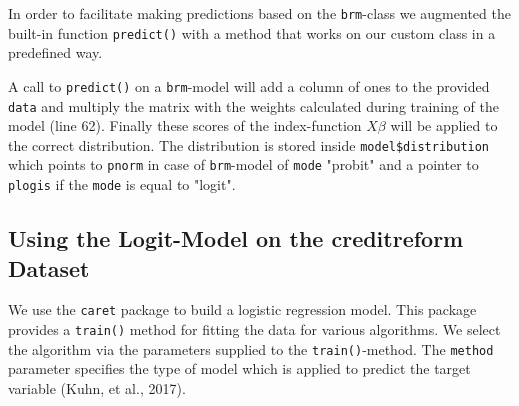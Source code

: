 \documentclass{article}
\begin{document}
In order to facilitate making predictions based on the \texttt{brm}-class we augmented the built-in function \texttt{predict()} with a method that works on our custom class in a predefined way.



A call to \texttt{predict()} on a \texttt{brm}-model will add a column of ones to the provided \texttt{data} and multiply the matrix with the weights calculated during training of the model (line 62). Finally these scores of the index-function $X\beta$ will be applied to the correct distribution. The distribution is stored inside \texttt{model\$distribution} which points to \texttt{pnorm} in case of \texttt{brm}-model of \texttt{mode} "probit" and a pointer to \texttt{plogis} if the \texttt{mode} is equal to "logit". 

\subsection{Using the Logit-Model on the creditreform Dataset}

We use the \texttt{caret} package to build a logistic regression model. This package provides a \texttt{train()} method for fitting the data for various algorithms. We select the algorithm via the parameters supplied to the \texttt{train()}-method. The \texttt{method} parameter specifies the type of model which is applied to predict the target variable (Kuhn, et al., 2017).


 
\end{document}
